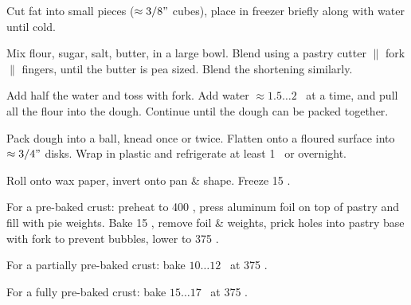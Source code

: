\begin{preparation}
\item Cut fat into small pieces ($\approx 3/8"$ cubes), place in freezer briefly along with water until cold.

\item Mix flour, sugar, salt, butter, in a large bowl.
	Blend using a pastry cutter $\|$ fork $\|$ fingers, until the butter is pea sized.
	Blend the shortening similarly.

\item Add half the water and toss with fork.
	Add water $\approx 1.5 \dots 2$ \Tablespoon~at a time, and pull all the flour into the dough.
	Continue until the dough can be packed together.

\item Pack dough into a ball, knead once or twice.
	Flatten onto a floured surface into $\approx 3/4"$ disks.
	Wrap in plastic and refrigerate at least 1 \hour~or overnight.

\item Roll onto wax paper, invert onto pan \& shape.
	Freeze 15 \minute.

\item For a pre-baked crust: preheat to 400 \Fahrenheit, press aluminum foil on top of pastry and fill with pie weights.
	Bake 15 \minute, remove foil \& weights, prick holes into pastry base with fork to prevent bubbles, lower to 375 \Fahrenheit.

\item For a partially pre-baked crust: bake $10 \dots 12$ \minute~at 375 \Fahrenheit.

\item For a fully pre-baked crust: bake $15 \dots 17$ \minute~at 375 \Fahrenheit.
\end{preparation}


\recipeend

